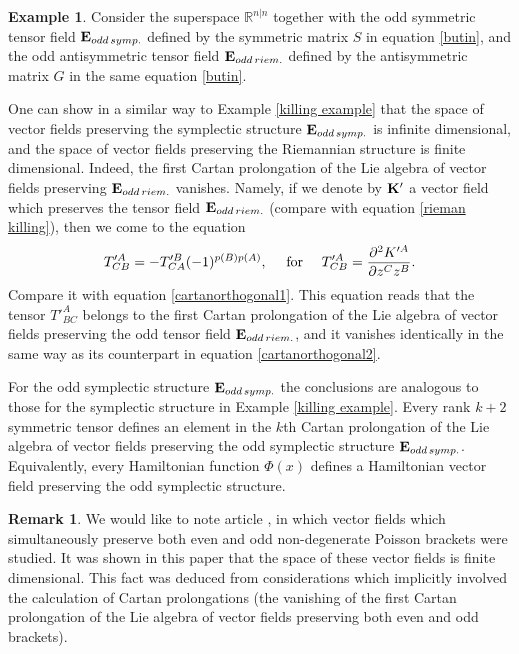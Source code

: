 \documentclass[12pt,reqno,a4paper]{amsart}
\theoremstyle{definition}
\newtheorem{remark}{Remark}
\newtheorem{example}{Example}[section]
\begin{document}
\begin{example}
Consider the superspace ${\mathbb{R}}^{n|n}$ together with the odd symmetric tensor field
 ${{\bf E}}_{odd\,symp.}$ defined by the symmetric matrix $S$ in equation
\eqref{butin}, and the odd antisymmetric tensor field ${{\bf E}}_{odd\,riem.}$
defined by the antisymmetric matrix $G$ in the same equation \eqref{butin}.

 One can show in a similar way to Example \ref{killing example}
that the space of vector fields preserving the symplectic structure
${{\bf E}}_{odd\,symp.}$ is infinite dimensional, and the space of
vector fields preserving the Riemannian structure is finite dimensional.
  Indeed, the first Cartan prolongation of the Lie algebra of vector
  fields preserving ${{\bf E}}_{odd\,riem.}$
vanishes. Namely, if we denote by ${{\bf K}}'$ a vector field
which preserves the tensor
field ${{\bf E}}_{odd\,riem.}$ (compare with equation \eqref{rieman killing}), then
we come to the equation
                      \begin{equation*}
     T'^{A}_{CB}=-T'^B_{CA}(-1)^{p(B)p(A)},\quad\mbox{ for }\quad
      T'^{A}_{CB}={{\partial}^2 K'^A\over {\partial} z^C z^B}.
                     \end{equation*}
Compare it with equation \eqref{cartanorthogonal1}. This equation reads that
the tensor $T'^{A}_{BC}$ belongs to the first Cartan prolongation of the Lie
algebra of vector fields preserving the odd tensor
field ${{\bf E}}_{odd\,riem.}$, and
it vanishes identically in the same way as
its counterpart in equation \eqref{cartanorthogonal2}.

   For the odd symplectic structure ${{\bf E}}_{odd\,symp.}$
the conclusions are analogous to
those for the symplectic structure in Example \ref{killing example}.
Every rank $k+2$ symmetric tensor
defines an element in the $k$th Cartan prolongation of the
Lie algebra of vector fields preserving the odd symplectic structure
 ${{\bf E}}_{odd\,symp.}$. Equivalently, every Hamiltonian function $\Phi(x)$
defines a Hamiltonian vector field preserving the odd symplectic structure.
\end{example}

\begin{remark}
  We would like to note article \cite{Khjmp1}, in which
  vector fields which simultaneously preserve both even and odd
non-degenerate Poisson brackets were studied. It was shown in this paper
that the space of these
vector fields is finite dimensional. This fact was deduced from
considerations which implicitly involved the calculation of
Cartan prolongations (the vanishing of the first Cartan prolongation
of the Lie algebra of vector fields preserving both even and odd brackets).
\end{remark}
\end{document}
